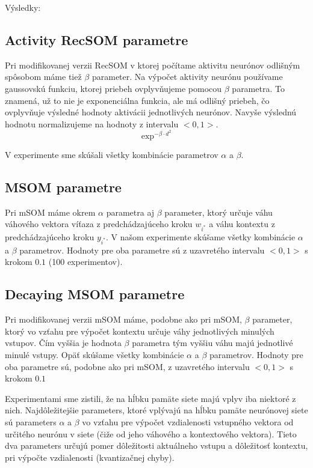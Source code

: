 
Výsledky: \\

\subsection{Activity RecSOM parametre}
Pri modifikovanej verzii RecSOM v ktorej počítame aktivitu neurónov
odlišným spôsobom máme tiež $\beta$ parameter. 
Na výpočet aktivity neurónu používame gaussovskú funkciu, ktorej priebeh ovplyvňujeme
pomocou $\beta$ parametra. To znamená, už to nie je exponenciálna funkcia, ale má odlišný priebeh, 
čo ovplyvňuje výsledné hodnoty aktivácii jednotlivých neurónov. Navyše výslednú hodnotu normalizujeme na
hodnoty z intervalu $<0, 1>$.
\begin{equation}
    \exp^{-\beta \cdot d^2}
\end{equation}

V experimente sme skúšali všetky kombinácie parametrov $\alpha$ a $\beta$.


\subsection{MSOM parametre}
Pri mSOM máme okrem $\alpha$ parametra aj $\beta$ parameter, ktorý určuje váhu
váhového vektora víťaza z predchádzajúceho kroku $w_{i^{*}}$ a váhu kontextu
z predchádzajúceho kroku $y_{i^{*}}$.
V našom experimente skúšame všetky kombinácie $\alpha$ a $\beta$ parametrov.
Hodnoty pre oba parametre sú z uzavretého intervalu $<0, 1>$ s krokom $0.1$ (100 experimentov).


\subsection{Decaying MSOM parametre}
Pri modifikovanej verzii mSOM máme, podobne ako pri mSOM, $\beta$ parameter, ktorý vo vzťahu 
pre výpočet kontextu určuje váhy jednotlivých minulých vstupov. Čím vyššia je hodnota $\beta$
parametra tým vyššiu váhu majú jednotlivé minulé vstupy.
Opäť skúšame všetky kombinácie $\alpha$ a $\beta$ parametrov.
Hodnoty pre oba parametre sú, podobne ako pri mSOM, z uzavretého intervalu $<0, 1>$ s krokom $0.1$




Experimentami sme zistili, že na hĺbku pamäte siete majú vplyv iba niektoré z nich. 
Najdôležitejšie parameters, ktoré vplývajú na hĺbku pamäte neurónovej siete sú parameters $\alpha$ a $\beta$
vo vzťahu pre výpočet vzdialenosti vstupného vektora od určitého neurónu v siete (čiže od jeho váhového a kontextového vektora).
Tieto dva parameters určujú pomer dôležitosti aktuálneho vstupu a dôležitosť kontextu, pri výpočte vzdialenosti (kvantizačnej chyby).

